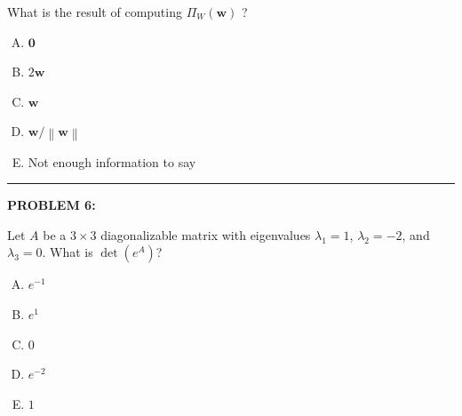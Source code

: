 \documentclass[12pt]{amsart}
\newcommand{\norm}[1]{\left\|#1\right\|}
\newcommand{\divider}{
  \vspace{-1em} %
  \noindent
  \raisebox{-0.15ex}{\textbullet}%
  \hspace{0.5em}%
  \rule[0.5ex]{0.95\textwidth}{1.0pt}%
  \hspace{0.5em}%
  \raisebox{-0.15ex}{\textbullet}%
  \vspace{0em} %
}
\begin{document}
What is the result of computing $\Pi_W(\mathbf{w})$ ?

\begin{enumerate}[(A)]
\item $\mathbf{0}$
\item $2\mathbf{w}$
\item $\mathbf{w}$
\item $\mathbf{w}/\norm{\mathbf{w}}$
\item Not enough information to say
\end{enumerate}


\divider

{\bf PROBLEM 6:}

Let $A$ be a $3 \times 3$ diagonalizable matrix with eigenvalues $\lambda_1 = 1$, $\lambda_2 = -2$, and $\lambda_3 = 0$. 
What is $\det(e^A)$?

\begin{enumerate}[(A)]
\item $e^{-1}$
\item $e^{1}$
\item $0$
\item $e^{-2}$
\item $1$
\end{enumerate}

\end{document}
